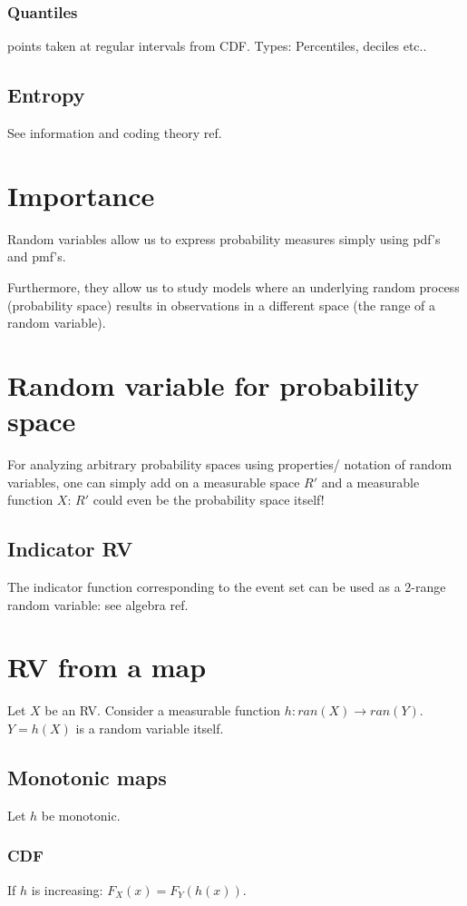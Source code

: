 \documentclass[oneside, article]{memoir}
\begin{document}
\subsubsection{Quantiles}
points taken at regular intervals from CDF. Types: Percentiles, deciles etc..

\subsection{Entropy}
See information and coding theory ref.

\section{Importance}
Random variables allow us to express probability measures simply using pdf's and pmf's.

Furthermore, they allow us to study models where an underlying random process (probability space) results in observations in a different space (the range of a random variable).

\section{Random variable for probability space}
For analyzing arbitrary probability spaces using properties/ notation of random variables, one can simply add on a measurable space $R'$ and a measurable function $X$: $R'$ could even be the probability space itself!

\subsection{Indicator RV}
The indicator function corresponding to the event set can be used as a 2-range random variable: see algebra ref.

\section{RV from a map}
Let $X$ be an RV. Consider a measurable function $h:ran(X) \to ran(Y)$. $Y = h(X)$ is a random variable itself.

\subsection{Monotonic maps}
Let $h$ be monotonic.

\subsubsection{CDF}
If $h$ is increasing: $F_X(x) = F_Y(h(x))$.
\end{document}
